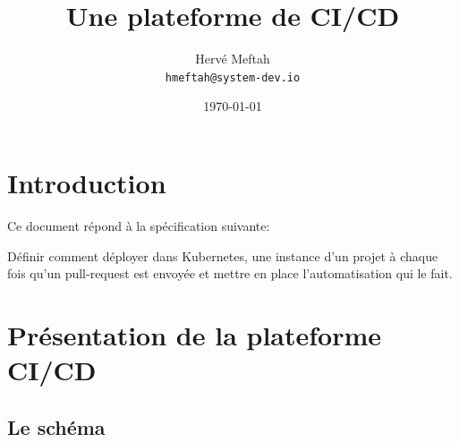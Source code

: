 \documentclass{article}
\title{Une plateforme de CI/CD } %
\author{Hervé Meftah\\ \texttt{hmeftah@system-dev.io}} %
\date{\today} %
\begin{document}
\maketitle %


\section*{Introduction} %

Ce document répond à la spécification suivante:

\begin{info}
	Définir comment déployer dans Kubernetes, une instance d’un projet à chaque fois qu’un pull-request est envoyée et
	mettre en place l’automatisation qui le fait.
\end{info}





\section{Présentation de la plateforme CI/CD } %


\subsection{Le schéma}
\end{document}
